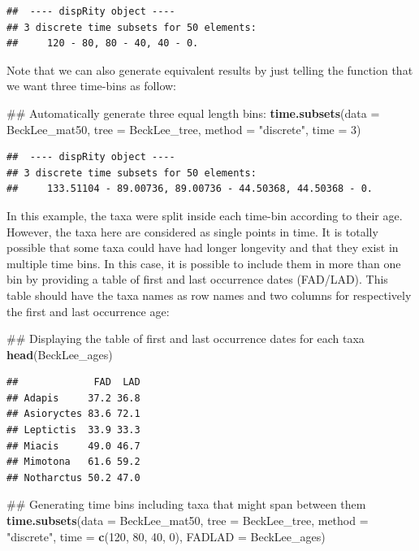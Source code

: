 \documentclass[]{book}
\newenvironment{Shaded}{\begin{snugshade}}{\end{snugshade}}
\newcommand{\KeywordTok}[1]{\textcolor[rgb]{0.13,0.29,0.53}{\textbf{#1}}}
\newcommand{\DataTypeTok}[1]{\textcolor[rgb]{0.13,0.29,0.53}{#1}}
\newcommand{\DecValTok}[1]{\textcolor[rgb]{0.00,0.00,0.81}{#1}}
\newcommand{\StringTok}[1]{\textcolor[rgb]{0.31,0.60,0.02}{#1}}
\newcommand{\NormalTok}[1]{#1}
\theoremstyle{definition}
\theoremstyle{definition}
\theoremstyle{remark}
\begin{document}
\begin{verbatim}
##  ---- dispRity object ---- 
## 3 discrete time subsets for 50 elements:
##     120 - 80, 80 - 40, 40 - 0.
\end{verbatim}

Note that we can also generate equivalent results by just telling the
function that we want three time-bins as follow:

\begin{Shaded}
\begin{Highlighting}[]
\NormalTok{## Automatically generate three equal length bins:}
\KeywordTok{time.subsets}\NormalTok{(}\DataTypeTok{data =}\NormalTok{ BeckLee_mat50, }\DataTypeTok{tree =}\NormalTok{ BeckLee_tree, }\DataTypeTok{method =} \StringTok{"discrete"}\NormalTok{,}
                \DataTypeTok{time =} \DecValTok{3}\NormalTok{)}
\end{Highlighting}
\end{Shaded}

\begin{verbatim}
##  ---- dispRity object ---- 
## 3 discrete time subsets for 50 elements:
##     133.51104 - 89.00736, 89.00736 - 44.50368, 44.50368 - 0.
\end{verbatim}

In this example, the taxa were split inside each time-bin according to
their age. However, the taxa here are considered as single points in
time. It is totally possible that some taxa could have had longer
longevity and that they exist in multiple time bins. In this case, it is
possible to include them in more than one bin by providing a table of
first and last occurrence dates (FAD/LAD). This table should have the
taxa names as row names and two columns for respectively the first and
last occurrence age:

\begin{Shaded}
\begin{Highlighting}[]
\NormalTok{## Displaying the table of first and last occurrence dates for each taxa}
\KeywordTok{head}\NormalTok{(BeckLee_ages)}
\end{Highlighting}
\end{Shaded}

\begin{verbatim}
##             FAD  LAD
## Adapis     37.2 36.8
## Asioryctes 83.6 72.1
## Leptictis  33.9 33.3
## Miacis     49.0 46.7
## Mimotona   61.6 59.2
## Notharctus 50.2 47.0
\end{verbatim}

\begin{Shaded}
\begin{Highlighting}[]
\NormalTok{## Generating time bins including taxa that might span between them}
\KeywordTok{time.subsets}\NormalTok{(}\DataTypeTok{data =}\NormalTok{ BeckLee_mat50, }\DataTypeTok{tree =}\NormalTok{ BeckLee_tree, }\DataTypeTok{method =} \StringTok{"discrete"}\NormalTok{,}
                \DataTypeTok{time =} \KeywordTok{c}\NormalTok{(}\DecValTok{120}\NormalTok{, }\DecValTok{80}\NormalTok{, }\DecValTok{40}\NormalTok{, }\DecValTok{0}\NormalTok{), }\DataTypeTok{FADLAD =}\NormalTok{ BeckLee_ages)}
\end{Highlighting}
\end{Shaded}
\end{document}
